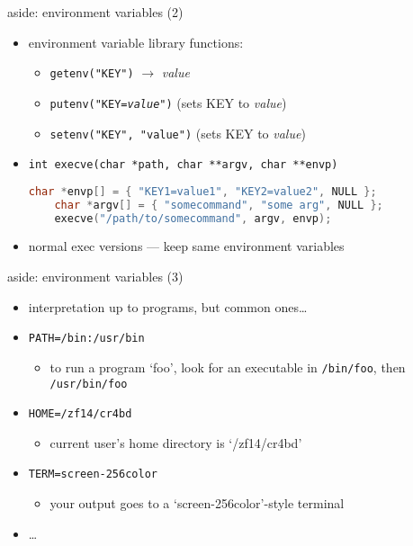 \begin{frame}[fragile,label=envVarsFuncs]{aside: environment variables (2)}
\begin{itemize}
\item environment variable library functions:
    \begin{itemize}
    \item \texttt{getenv("KEY")} $\rightarrow$ \textit{value}
    \item \texttt{putenv("KEY=\textit{value}")} (sets KEY to \textit{value})
    \item \texttt{setenv("KEY", "value")} (sets KEY to \textit{value})
    \end{itemize}
\item {\fontsize{12}{13}\texttt{int execve(char *path, char **argv, char **envp)}}
\begin{lstlisting}[language=C++,style=small]
    char *envp[] = { "KEY1=value1", "KEY2=value2", NULL };
    char *argv[] = { "somecommand", "some arg", NULL };
    execve("/path/to/somecommand", argv, envp);
\end{lstlisting}
\item normal exec versions --- keep same environment variables
\end{itemize}
\end{frame}

\begin{frame}[fragile,label=envVarsUse]{aside: environment variables (3)}
\begin{itemize}
\item interpretation up to programs, but common ones\ldots
\vspace{.5cm}
\item \texttt{PATH=/bin:/usr/bin} 
    \begin{itemize}
    \item to run a program `foo', look for an executable in \texttt{/bin/foo}, then \texttt{/usr/bin/foo}
    \end{itemize}
\item \texttt{HOME=/zf14/cr4bd} 
    \begin{itemize}
    \item current user's home directory is `/zf14/cr4bd'
    \end{itemize}
\item \texttt{TERM=screen-256color} 
    \begin{itemize}
    \item your output goes to a `screen-256color'-style terminal
    \end{itemize}
\item \ldots
\end{itemize}
\end{frame}
